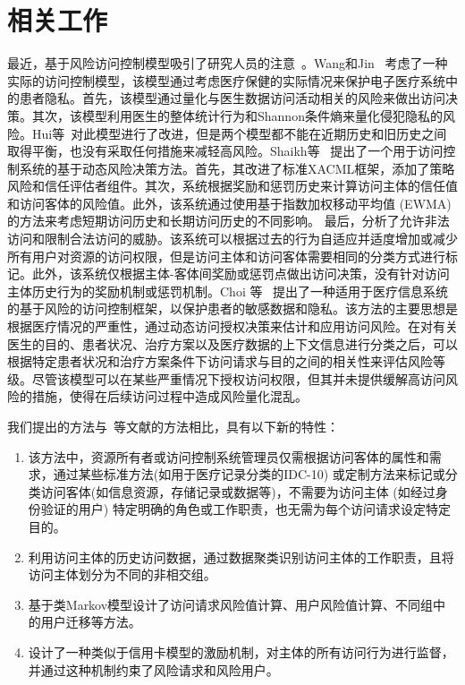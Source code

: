 \section{相关工作}
\label{sec:relate}
最近，基于风险访问控制模型吸引了研究人员的注意~\cite{wang2011quantified,shaikh2012dynamic,choi2015framework}。Wang和Jin~\cite{wang2011quantified} 考虑了一种实际的访问控制模型，该模型通过考虑医疗保健的实际情况来保护电子医疗系统中的患者隐私。首先，该模型通过量化与医生数据访问活动相关的风险来做出访问决策。其次，该模型利用医生的整体统计行为和Shannon条件熵来量化侵犯隐私的风险。Hui等~\cite{hui2015risk}对此模型进行了改进，但是两个模型都不能在近期历史和旧历史之间取得平衡，也没有采取任何措施来减轻高风险。Shaikh等~\cite{shaikh2012dynamic} 提出了一个用于访问控制系统的基于动态风险决策方法。首先，其改进了标准XACML框架，添加了策略风险和信任评估者组件。其次，系统根据奖励和惩罚历史来计算访问主体的信任值和访问客体的风险值。此外，该系统通过使用基于指数加权移动平均值 (EWMA) 的方法来考虑短期访问历史和长期访问历史的不同影响。 最后，分析了允许非法访问和限制合法访问的威胁。该系统可以根据过去的行为自适应并适度增加或减少所有用户对资源的访问权限，但是访问主体和访问客体需要相同的分类方式进行标记。此外，该系统仅根据主体-客体间奖励或惩罚点做出访问决策，没有针对访问主体历史行为的奖励机制或惩罚机制。Choi 等~\cite{choi2015framework}  提出了一种适用于医疗信息系统的基于风险的访问控制框架，以保护患者的敏感数据和隐私。该方法的主要思想是根据医疗情况的严重性，通过动态访问授权决策来估计和应用访问风险。在对有关医生的目的、患者状况、治疗方案以及医疗数据的上下文信息进行分类之后，可以根据特定患者状况和治疗方案条件下访问请求与目的之间的相关性来评估风险等级。尽管该模型可以在某些严重情况下授权访问权限，但其并未提供缓解高访问风险的措施，使得在后续访问过程中造成风险量化混乱。

我们提出的方法与~\cite{wang2011quantified,shaikh2012dynamic,choi2015framework}等文献的方法相比，具有以下新的特性：

\begin{enumerate}
	\item 该方法中，资源所有者或访问控制系统管理员仅需根据访问客体的属性和需求，通过某些标准方法(如用于医疗记录分类的IDC-10) 或定制方法来标记或分类访问客体(如信息资源，存储记录或数据等)，不需要为访问主体 (如经过身份验证的用户) 特定明确的角色或工作职责，也无需为每个访问请求设定特定目的。
	\item 利用访问主体的历史访问数据，通过数据聚类识别访问主体的工作职责，且将访问主体划分为不同的非相交组。
	\item 基于类Markov模型设计了访问请求风险值计算、用户风险值计算、不同组中的用户迁移等方法。
	\item 设计了一种类似于信用卡模型的激励机制，对主体的所有访问行为进行监督，并通过这种机制约束了风险请求和风险用户。
\end{enumerate}

